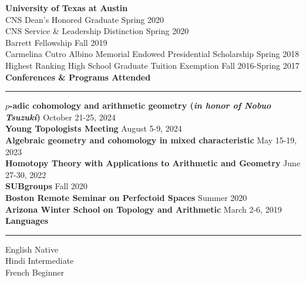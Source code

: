 \documentclass[11pt]{article}
\newenvironment{mysection}{
\color{mygreen}\bfseries\large
}
{
\\ \rule{\textwidth}{1pt}\hspace{-.25em}
} %
\begin{document}
\textbf{University of Texas at Austin} \\
CNS Dean's Honored Graduate \hfill Spring 2020 \\
CNS Service \& Leadership Distinction \hfill Spring 2020 \\
Barrett Fellowship \hfill Fall 2019 \\
Carmelina Cutro Albino Memorial Endowed Presidential Scholarship \hfill Spring 2018 \\
Highest Ranking High School Graduate Tuition Exemption \hfill Fall 2016-Spring 2017 \\

\begin{mysection}Conferences \& Programs Attended\end{mysection}
\textbf{$p$-adic cohomology and arithmetic geometry (\emph{in honor of Nobuo Tsuzuki})} \hfill October 21-25, 2024 \\
\textbf{Young Topologists Meeting} \hfill August 5-9, 2024 \\
\textbf{Algebraic geometry and cohomology in mixed characteristic} \hfill May 15-19, 2023 \\
\textbf{Homotopy Theory with Applications to Arithmetic and Geometry} \hfill June 27-30, 2022 \\
\textbf{SUBgroups} \hfill Fall 2020 \\
\textbf{Boston Remote Seminar on Perfectoid Spaces} \hfill Summer 2020 \\
\textbf{Arizona Winter School on Topology and Arithmetic} \hfill March 2-6, 2019 \\

\begin{mysection}Languages\end{mysection}
English \hfill Native \\
Hindi \hfill Intermediate \\
French \hfill Beginner \\
\end{document}
